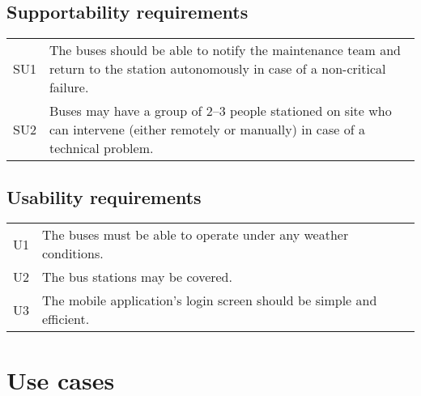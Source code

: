 \documentclass[a4paper]{article}
\begin{document}
\subsection{Supportability requirements}
\begin{tabularx}{\textwidth}{p{.75cm} X}
	SU1 & The buses should be able to notify the maintenance team and return
	      to the station autonomously in case of a non-critical failure. \\
	SU2 & Buses may have a group of 2–3 people stationed on site who can
	      intervene (either remotely or manually) in case of a technical
	      problem. \\
\end{tabularx}


\subsection{Usability requirements}
\begin{tabularx}{\textwidth}{p{.75cm} X}
        U1 & The buses must be able to operate under any weather conditions. \\
        U2 & The bus stations may be covered. \\
	U3 & The mobile application’s login screen should be simple and
	     efficient. \\
\end{tabularx}



\section{Use cases}
\end{document}
